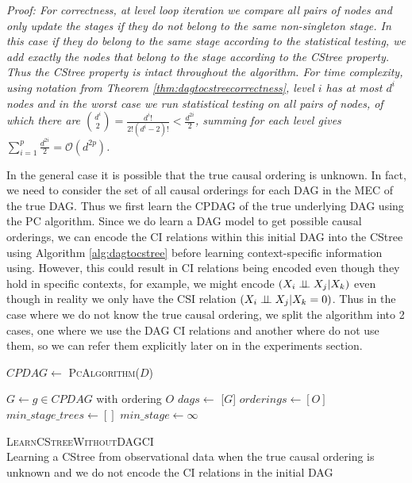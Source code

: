 \documentclass{tufte-book}
\begin{document}
\textit{Proof:
For correctness, at level loop iteration we compare all pairs of nodes and only update the stages if they do not belong to the same non-singleton stage. In this case if they do belong to the same stage according to the statistical testing, we add exactly the nodes that belong to the stage according to the CStree property. Thus the CStree property is intact throughout the algorithm. For time complexity, using notation from Theorem \ref{thm:dagtocstreecorrectness}, level $i$ has at most $d^i$ nodes and in the worst case we run statistical testing on all pairs of nodes, of which there are ${d^i \choose 2} = \frac{d^i !}{2! (d^i - 2)!} < \frac{d^{2i}}{2}$, summing for each level gives $\sum_{i=1}^p \frac{d^{2i}}{2}  = \mathcal{O}(d^{2p})$.
}

In the general case it is possible that the true causal ordering is unknown. In fact, we need to consider the set of all causal orderings for each DAG in the MEC of the true DAG. Thus we first learn the CPDAG of the true underlying DAG using the PC algorithm. Since we do learn a DAG model to get possible causal orderings, we can encode the CI relations within this initial DAG into the CStree using Algorithm \ref{alg:dagtocstree} before learning context-specific information using. However, this could result in CI relations being encoded even though they hold in specific contexts, for example, we might encode \((X_i \perp \!\!\! \perp X_j | X_k)\) even though in reality we only have the CSI relation \((X_i \perp \!\!\! \perp X_j | X_k=0)\). Thus in the case where we do not know the true causal ordering, we split the algorithm into 2 cases, one where we use the DAG CI relations and another where do not use them, so we can refer them explicitly later on in the experiments section. 




\begin{algorithm}\label{alg:cstreepc}
\SetAlgoLined
{}
$CPDAG \gets$ \textsc{PcAlgorithm}($D$)\;

{
$G \gets g \in CPDAG$ with ordering $O$\;
$dags \gets$ [$G$]\;
$orderings \gets [O]$\;
}
$min\_stage\_trees \gets []$\;
$min\_stage \gets \infty$\;
\caption{\textsc{LearnCStreeWithoutDAGCI} \\ Learning a CStree from observational data when the true causal ordering is unknown and we do not encode the CI relations in the initial DAG}

\end{algorithm}
\end{document}
